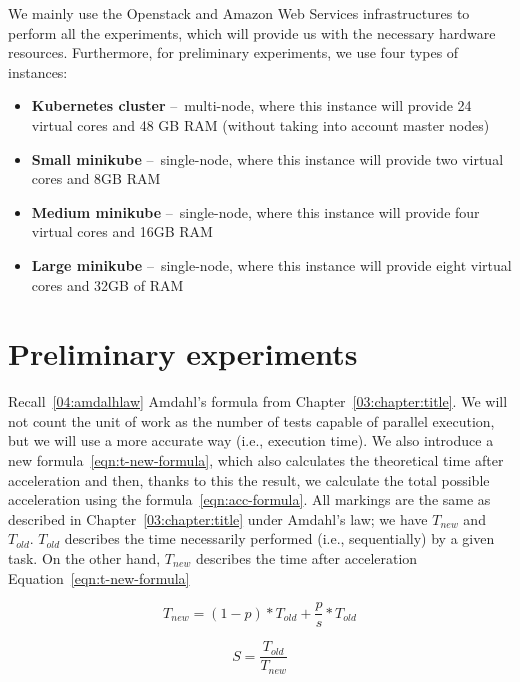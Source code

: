 We mainly use the Openstack and Amazon Web Services infrastructures to perform all the experiments, which will provide us with the necessary hardware resources.
Furthermore, for preliminary experiments, we use four types of instances:
\begin{itemize}
    \item \textbf{Kubernetes cluster} \---\ multi-node, where this instance will provide 24 virtual cores and 48 GB RAM (without taking into account master nodes)
    \item \textbf{Small minikube} \---\ single-node, where this instance will provide two virtual cores and 8GB RAM
    \item \textbf{Medium minikube} \---\ single-node, where this instance will provide four virtual cores and 16GB RAM
    \item \textbf{Large minikube} \---\ single-node, where this instance will provide eight virtual cores and 32GB of RAM
\end{itemize}

\section{Preliminary experiments}

Recall~\ref{04:amdalhlaw} Amdahl's formula from Chapter~\ref{03:chapter:title}.
We will not count the unit of work as the number of tests capable of parallel execution, but we will use a more accurate way (i.e., execution time).
We also introduce a new formula~\eqref{eqn:t-new-formula}, which also calculates the theoretical time after acceleration and then, thanks to this
the result, we calculate the total possible acceleration using the formula~\eqref{eqn:acc-formula}.
All markings are the same as described in Chapter~\ref{03:chapter:title} under Amdahl's law;
we have $T_{new}$ and $T_{old}$. $T_{old}$ describes the time necessarily performed (i.e., sequentially) by a given task.
On the other hand, $T_{new}$ describes the time after acceleration Equation~\eqref{eqn:t-new-formula}

\begin{equation}
    \label{eqn:t-new-formula}
    T_{new} = (1 - p) * T_{old} +  \frac{p}{s} * T_{old}
    \tag{4}
\end{equation}

\begin{equation}
    \label{eqn:acc-formula}
    S = \frac{T_{old}}{T_{new}}
    \tag{5}
\end{equation}

